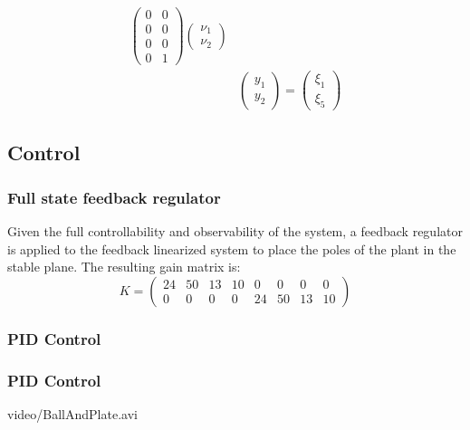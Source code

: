 \begin{frame}
\begin{equation}
\begin{aligned}
\begin{pmatrix}
	 		0 &0 \\
	 		0 &0 \\
	 		0 &0 \\
	 		0 &1
	 	\end{pmatrix}
	 	\begin{pmatrix}
	 		\nu_1 \\ \nu_2
	 	\end{pmatrix}\\[6pt]
	 	&\begin{pmatrix}
	 		y_1\\ y_2
	 	\end{pmatrix}=%
	 	\begin{pmatrix}
	 		\xi_1\\ \xi_5
	 	\end{pmatrix}%
	\end{aligned}
\end{equation}
\end{frame}
%
\subsection{Control}
%
\begin{frame}
\frametitle{Full state feedback regulator}
Given the full controllability and observability of the system, a feedback regulator is applied to the feedback linearized system to place the poles of the plant in the stable plane. The resulting gain matrix is:
\begin{equation}
	K =%
	\begin{pmatrix}
		24 &50 &13 &10 &0 &0 &0 &0 \\
		0 &0 &0 &0 &24 &50 &13 &10
	\end{pmatrix}
\end{equation}
\end{frame}
\begin{frame}
\frametitle{PID Control}
\end{frame}
%
\begin{frame}
\frametitle{PID Control}
%
\begin{center}
	\movie[width=11cm,height=5.01cm,autostart,loop,poster,showcontrols=true]%
	{}%
	{video/BallAndPlate.avi}
\end{center}
\end{frame}